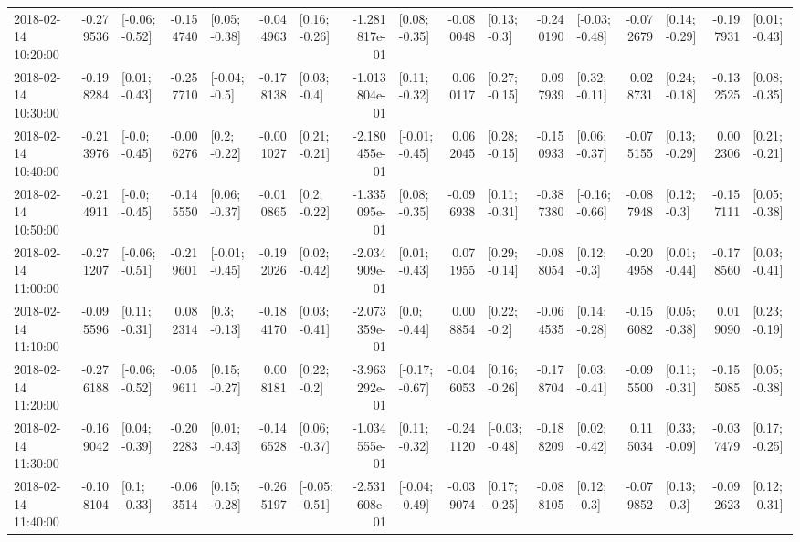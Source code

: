 \begin{tabular}{lrlrlrlrlrlrlrlrl}
2018-02-14 10:20:00 & -0.279536 &  [-0.06; -0.52] & -0.154740 &   [0.05; -0.38] & -0.044963 &   [0.16; -0.26] & -1.281817e-01 &   [0.08; -0.35] & -0.080048 &    [0.13; -0.3] & -0.240190 &  [-0.03; -0.48] & -0.072679 &   [0.14; -0.29] & -0.197931 &   [0.01; -0.43] \\
2018-02-14 10:30:00 & -0.198284 &   [0.01; -0.43] & -0.257710 &   [-0.04; -0.5] & -0.178138 &    [0.03; -0.4] & -1.013804e-01 &   [0.11; -0.32] &  0.060117 &   [0.27; -0.15] &  0.097939 &   [0.32; -0.11] &  0.028731 &   [0.24; -0.18] & -0.132525 &   [0.08; -0.35] \\
2018-02-14 10:40:00 & -0.213976 &   [-0.0; -0.45] & -0.006276 &    [0.2; -0.22] & -0.001027 &   [0.21; -0.21] & -2.180455e-01 &  [-0.01; -0.45] &  0.062045 &   [0.28; -0.15] & -0.150933 &   [0.06; -0.37] & -0.075155 &   [0.13; -0.29] &  0.002306 &   [0.21; -0.21] \\
2018-02-14 10:50:00 & -0.214911 &   [-0.0; -0.45] & -0.145550 &   [0.06; -0.37] & -0.010865 &    [0.2; -0.22] & -1.335095e-01 &   [0.08; -0.35] & -0.096938 &   [0.11; -0.31] & -0.387380 &  [-0.16; -0.66] & -0.087948 &    [0.12; -0.3] & -0.157111 &   [0.05; -0.38] \\
2018-02-14 11:00:00 & -0.271207 &  [-0.06; -0.51] & -0.219601 &  [-0.01; -0.45] & -0.192026 &   [0.02; -0.42] & -2.034909e-01 &   [0.01; -0.43] &  0.071955 &   [0.29; -0.14] & -0.088054 &    [0.12; -0.3] & -0.204958 &   [0.01; -0.44] & -0.178560 &   [0.03; -0.41] \\
2018-02-14 11:10:00 & -0.095596 &   [0.11; -0.31] &  0.082314 &    [0.3; -0.13] & -0.184170 &   [0.03; -0.41] & -2.073359e-01 &    [0.0; -0.44] &  0.008854 &    [0.22; -0.2] & -0.064535 &   [0.14; -0.28] & -0.156082 &   [0.05; -0.38] &  0.019090 &   [0.23; -0.19] \\
2018-02-14 11:20:00 & -0.276188 &  [-0.06; -0.52] & -0.059611 &   [0.15; -0.27] &  0.008181 &    [0.22; -0.2] & -3.963292e-01 &  [-0.17; -0.67] & -0.046053 &   [0.16; -0.26] & -0.178704 &   [0.03; -0.41] & -0.095500 &   [0.11; -0.31] & -0.155085 &   [0.05; -0.38] \\
2018-02-14 11:30:00 & -0.169042 &   [0.04; -0.39] & -0.202283 &   [0.01; -0.43] & -0.146528 &   [0.06; -0.37] & -1.034555e-01 &   [0.11; -0.32] & -0.241120 &  [-0.03; -0.48] & -0.188209 &   [0.02; -0.42] &  0.115034 &   [0.33; -0.09] & -0.037479 &   [0.17; -0.25] \\
2018-02-14 11:40:00 & -0.108104 &    [0.1; -0.33] & -0.063514 &   [0.15; -0.28] & -0.265197 &  [-0.05; -0.51] & -2.531608e-01 &  [-0.04; -0.49] & -0.039074 &   [0.17; -0.25] & -0.088105 &    [0.12; -0.3] & -0.079852 &    [0.13; -0.3] & -0.092623 &   [0.12; -0.31] \\

\end{tabular}
